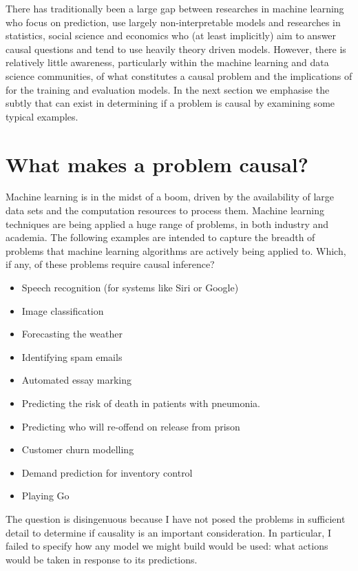 \documentclass[11pt,a4paper,oneside]{book}
\theoremstyle{plain}
\theoremstyle{definition}
\begin{document}
There has traditionally been a large gap between researches in machine learning who focus on prediction, use largely non-interpretable models and researches in statistics, social science and economics who (at least implicitly) aim to answer causal questions and tend to use heavily theory driven models. However, there is relatively little awareness, particularly within the machine learning and data science communities, of what constitutes a causal problem and the implications of for the training and evaluation models. In the next section we emphasise the subtly that can exist in determining if a problem is causal by examining some typical examples. 

\section{What makes a problem causal?}

Machine learning is in the midst of a boom, driven by the availability of large data sets and the computation resources to process them. Machine learning techniques are being applied a huge range of problems, in both industry and academia. The following examples are intended to capture the breadth of problems that machine learning algorithms are actively being applied to. Which, if any, of these problems require causal inference? 

\begin{itemize}
\item Speech recognition (for systems like Siri or Google)
\item Image classification
\item Forecasting the weather
\item Identifying spam emails
\item Automated essay marking
\item Predicting the risk of death in patients with pneumonia.
\item Predicting who will re-offend on release from prison 
\item Customer churn modelling
\item Demand prediction for inventory control
\item Playing Go 
\end{itemize}

The question is disingenuous because I have not posed the problems in sufficient detail to determine if causality is an important consideration. In particular, I failed to specify how any model we might build would be used: what actions would be taken in response to its predictions. 
\end{document}
